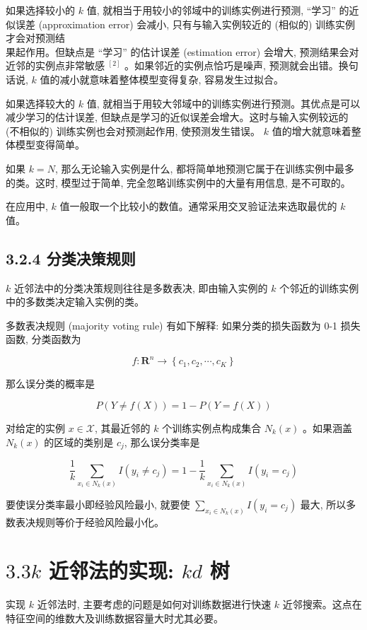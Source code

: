 \documentclass[10pt]{article}
\begin{document}
如果选择较小的 $k$ 值, 就相当于用较小的邻域中的训练实例进行预测, “学习” 的近似误差 (approximation error) 会减小, 只有与输入实例较近的 (相似的) 训练实例才会对预测结\\
果起作用。但缺点是 “学习” 的估计误差 (estimation error) 会增大, 预测结果会对近邻的实例点非常敏感 ${ }^{[2]}$ 。如果邻近的实例点恰巧是噪声, 预测就会出错。换句话说, $k$ 值的减小就意味着整体模型变得复杂, 容易发生过拟合。

如果选择较大的 $k$ 值, 就相当于用较大邻域中的训练实例进行预测。其优点是可以减少学习的估计误差, 但缺点是学习的近似误差会增大。这时与输入实例较远的 (不相似的) 训练实例也会对预测起作用, 使预测发生错误。 $k$ 值的增大就意味着整体模型变得简单。

如果 $k=N$, 那么无论输入实例是什么, 都将简单地预测它属于在训练实例中最多的类。这时, 模型过于简单, 完全忽略训练实例中的大量有用信息, 是不可取的。

在应用中, $k$ 值一般取一个比较小的数值。通常采用交叉验证法来选取最优的 $k$ 值。

\subsection*{3.2.4 分类决策规则}
$k$ 近邻法中的分类决策规则往往是多数表决, 即由输入实例的 $k$ 个邻近的训练实例中的多数类决定输入实例的类。

多数表决规则 (majority voting rule) 有如下解释: 如果分类的损失函数为 0-1 损失函数, 分类函数为

$$
f: \boldsymbol{R}^{n} \rightarrow\left\{c_{1}, c_{2}, \cdots, c_{K}\right\}
$$

那么误分类的概率是

$$
P(Y \neq f(X))=1-P(Y=f(X))
$$

对给定的实例 $x \in \mathcal{X}$, 其最近邻的 $k$ 个训练实例点构成集合 $N_{k}(x)$ 。如果涵盖 $N_{k}(x)$ 的区域的类别是 $c_{j}$, 那么误分类率是

$$
\frac{1}{k} \sum_{x_{i} \in N_{k}(x)} I\left(y_{i} \neq c_{j}\right)=1-\frac{1}{k} \sum_{x_{i} \in N_{k}(x)} I\left(y_{i}=c_{j}\right)
$$

要使误分类率最小即经验风险最小, 就要使 $\sum_{x_{i} \in N_{k}(x)} I\left(y_{i}=c_{j}\right)$ 最大, 所以多数表决规则等价于经验风险最小化。

\section*{$3.3 k$ 近邻法的实现: $k d$ 树}
实现 $k$ 近邻法时, 主要考虑的问题是如何对训练数据进行快速 $k$ 近邻搜索。这点在特征空间的维数大及训练数据容量大时尤其必要。
\end{document}
